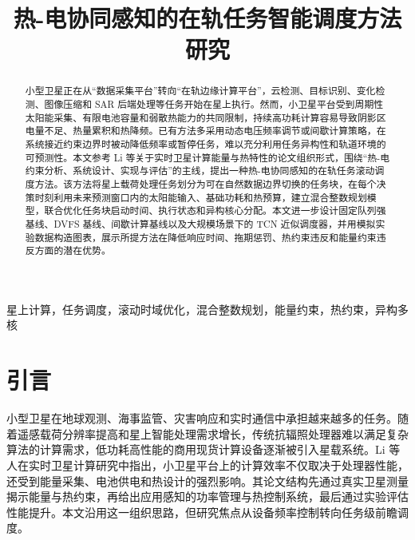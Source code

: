 \newcommand{\method}{\textsc{TEBS-RHC}}
\newcommand{\rhc}{\texttt{RHC-MILP}}
\newcommand{\rhcfull}{\texttt{RHC-MILP-Gurobi}}
\newcommand{\fcfsg}{\texttt{FCFS-Gurobi}}
\newcommand{\dvfs}{\texttt{FCFS-DVFS}}
\newcommand{\intermittent}{\texttt{FCFS-Intermittent}}
\newcommand{\tcns}{\texttt{TCN-Scheduler}}
\newcommand{\hybrid}{\texttt{Hybrid-Gurobi-TCN}}

\title{热-电协同感知的在轨任务智能调度方法研究}

\author{
}


\maketitle

\begin{abstract}
小型卫星正在从“数据采集平台”转向“在轨边缘计算平台”，云检测、目标识别、变化检测、图像压缩和 SAR 后端处理等任务开始在星上执行。然而，小卫星平台受到周期性太阳能采集、有限电池容量和弱散热能力的共同限制，持续高功耗计算容易导致阴影区电量不足、热量累积和热降频。已有方法多采用动态电压频率调节或间歇计算策略，在系统接近约束边界时被动降低频率或暂停任务，难以充分利用任务异构性和轨道环境的可预测性。本文参考 Li 等关于实时卫星计算能量与热特性的论文组织形式，围绕“热-电约束分析、系统设计、实现与评估”的主线，提出一种热-电协同感知的在轨任务滚动调度方法。该方法将星上载荷处理任务划分为可在自然数据边界切换的任务块，在每个决策时刻利用未来预测窗口内的太阳能输入、基础功耗和热预算，建立混合整数规划模型，联合优化任务块启动时间、执行状态和异构核心分配。本文进一步设计固定队列强基线、DVFS 基线、间歇计算基线以及大规模场景下的 TCN 近似调度器，并用模拟实验数据构造图表，展示所提方法在降低响应时间、拖期惩罚、热约束违反和能量约束违反方面的潜在优势。
\end{abstract}

\begin{IEEEkeywords}
星上计算，任务调度，滚动时域优化，混合整数规划，能量约束，热约束，异构多核
\end{IEEEkeywords}

\section{引言}

小型卫星在地球观测、海事监管、灾害响应和实时通信中承担越来越多的任务。随着遥感载荷分辨率提高和星上智能处理需求增长，传统抗辐照处理器难以满足复杂算法的计算需求，低功耗高性能的商用现货计算设备逐渐被引入星载系统。Li 等人在实时卫星计算研究中指出，小卫星平台上的计算效率不仅取决于处理器性能，还受到能量采集、电池供电和热设计的强烈影响。其论文结构先通过真实卫星测量揭示能量与热约束，再给出应用感知的功率管理与热控制系统，最后通过实验评估性能提升。本文沿用这一组织思路，但研究焦点从设备频率控制转向任务级前瞻调度。


